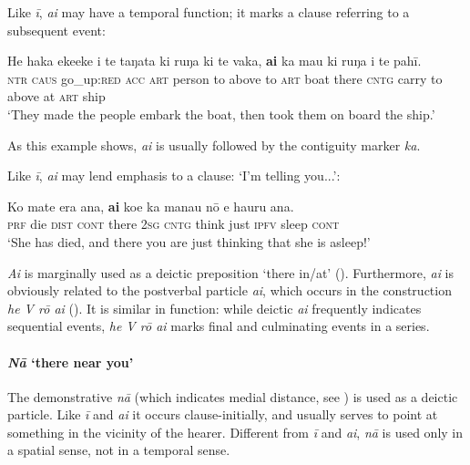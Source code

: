 Like \textit{{\ꞌ}ī}, \textit{{\ꞌ}ai} may have a temporal function; it marks a clause referring to a subsequent event:

\ea\label{ex:4.156}
\gll He haka ekeeke i te taŋata ki ruŋa ki te vaka, \textbf{{\ꞌ}ai} ka ma{\ꞌ}u  ki ruŋa i te pahī.\\
\textsc{ntr} \textsc{caus} go\_up:\textsc{red} \textsc{acc} \textsc{art} person to above to \textsc{art} boat there \textsc{cntg} carry  to above at \textsc{art} ship\\

\glt
‘They made the people embark the boat, then took them on board the ship.’ \textstyleExampleref{[R210.042]} 
\z

As this example shows, \textit{{\ꞌ}ai} is usually followed by the contiguity marker \textit{ka}.

Like \textit{{\ꞌ}ī}, \textit{{\ꞌ}ai} may lend emphasis to a clause: ‘I’m telling you...’:

\ea\label{ex:4.157}
\gll Ko mate era {\ꞌ}ana, \textbf{{\ꞌ}ai} koe ka mana{\ꞌ}u nō e ha{\ꞌ}uru {\ꞌ}ana.\\
\textsc{prf} die \textsc{dist} \textsc{cont} there \textsc{2sg} \textsc{cntg} think just \textsc{ipfv} sleep \textsc{cont}\\

\glt 
‘She has died, and there you are just thinking that she is asleep!’ \textstyleExampleref{[R229.303]} 
\z

\textit{{\ꞌ}Ai} is marginally used as a deictic preposition ‘there in/at’ (). Furthermore, \textit{{\ꞌ}ai} is obviously related to the postverbal particle \textit{{\ꞌ}ai}, which occurs in the construction \textit{he V rō {\ꞌ}ai} (). It is similar in function: while deictic \textit{{\ꞌ}ai} frequently indicates sequential events, \textit{he V rō {\ꞌ}ai} marks final and culminating events in a series.
\paragraph{\textit{Nā} ‘there near you’}\label{sec:4.5.4.1.3}
The demonstrative \textit{nā} (which indicates medial distance, see ) is used as a deictic particle. Like \textit{{\ꞌ}ī} and \textit{{\ꞌ}ai} it occurs clause-initially, and usually serves to point at something in the vicinity of the hearer. Different from \textit{{\ꞌ}ī} and \textit{{\ꞌ}ai}, \textit{nā} is used only in a spatial sense, not in a temporal sense.

